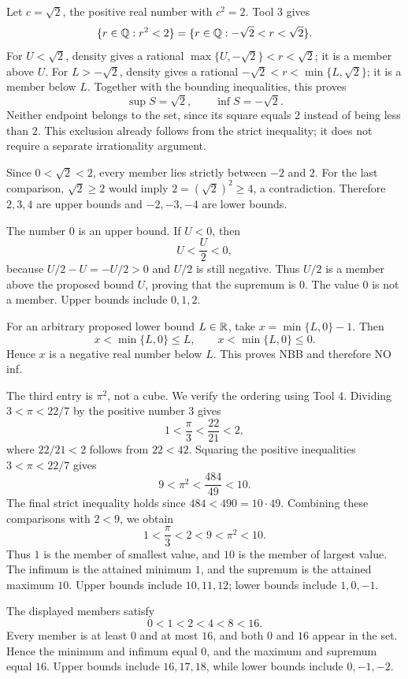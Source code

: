 \label{bounds:n}
Let $c=\sqrt2$, the positive real number with $c^2=2$.
Tool 3 gives
\[
 \{r\in\mathbb{Q}:r^2<2\}=\{r\in\mathbb{Q}:-\sqrt2<r<\sqrt2\}.
\]
For $U<\sqrt2$, density gives a rational
$\max\{U,-\sqrt2\}<r<\sqrt2$; it is a member above $U$.
For $L>-\sqrt2$, density gives a rational
$-\sqrt2<r<\min\{L,\sqrt2\}$; it is a member below $L$.
Together with the bounding inequalities, this proves
\[
 \sup S=\sqrt2,\qquad \inf S=-\sqrt2.
\]
Neither endpoint belongs to the set, since its square equals $2$
instead of being less than $2$. This exclusion already follows from
the strict inequality; it does not require a separate irrationality
argument.

Since $0<\sqrt2<2$, every member lies strictly between $-2$ and
$2$. For the last comparison, $\sqrt2\geq2$ would imply
$2=(\sqrt2)^2\geq4$, a contradiction. Therefore $2,3,4$ are
upper bounds and $-2,-3,-4$ are lower bounds.

\label{bounds:o}
The number $0$ is an upper bound. If $U<0$, then
\[
 U<\frac U2<0,
\]
because $U/2-U=-U/2>0$ and $U/2$ is still negative.
Thus $U/2$ is a member above the proposed bound $U$, proving
that the supremum is $0$. The value $0$ is not a member.
Upper bounds include $0,1,2$.

For an arbitrary proposed lower bound $L\in\mathbb{R}$, take
$x=\min\{L,0\}-1$. Then
\[
 x<\min\{L,0\}\leq L,
 \qquad x<\min\{L,0\}\leq0.
\]
Hence $x$ is a negative real number below $L$. This proves NBB
and therefore NO inf.

\label{bounds:p}
The third entry is $\pi^2$, not a cube. We verify the ordering
using Tool 4. Dividing $3<\pi<22/7$ by the positive number $3$
gives
\[
 1<\frac\pi3<\frac{22}{21}<2,
\]
where $22/21<2$ follows from $22<42$. Squaring the positive
inequalities $3<\pi<22/7$ gives
\[
 9<\pi^2<\frac{484}{49}<10.
\]
The final strict inequality holds since $484<490=10\cdot49$.
Combining these comparisons with $2<9$, we obtain
\[
 1<\frac\pi3<2<9<\pi^2<10.
\]
Thus $1$ is the member of smallest value, and $10$ is the member
of largest value. The infimum is the attained minimum $1$, and
the supremum is the attained maximum $10$. Upper bounds include
$10,11,12$; lower bounds include $1,0,-1$.

\label{bounds:q}
The displayed members satisfy
\[
 0<1<2<4<8<16.
\]
Every member is at least $0$ and at most $16$, and both $0$ and
$16$ appear in the set. Hence the minimum and infimum equal $0$,
and the maximum and supremum equal $16$. Upper bounds include
$16,17,18$, while lower bounds include $0,-1,-2$.

